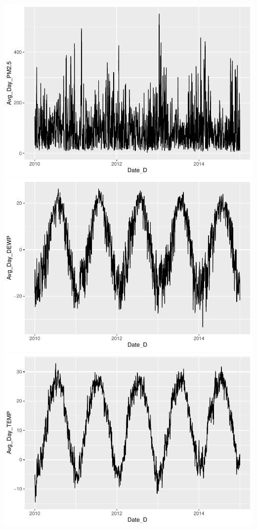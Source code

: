 \documentclass[
]{article}
\begin{document}
\includegraphics{Final_Project_1_files/figure-latex/unnamed-chunk-2-2.pdf}
\includegraphics{Final_Project_1_files/figure-latex/unnamed-chunk-2-3.pdf}
\includegraphics{Final_Project_1_files/figure-latex/unnamed-chunk-2-4.pdf}
\end{document}
